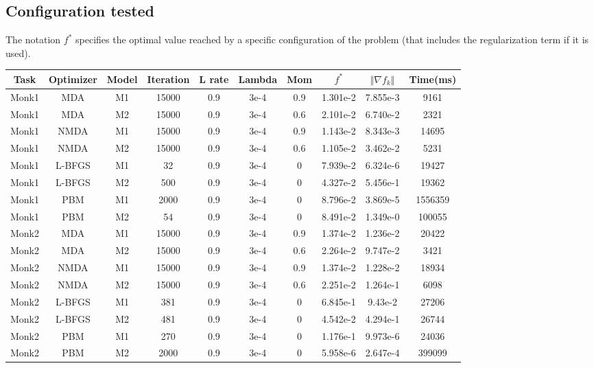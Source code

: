 \subsection{Configuration tested}
The notation $f^*$ specifies the optimal value reached by a specific configuration of the problem (that includes the regularization term if it is used). 

\begin{center}
	\small\addtolength{\tabcolsep}{-3pt}
		\centering
		\begin{longtable}{|c|c|c|c|c|c|c|c|c|c|}
			\hline
			\textbf{Task}& \textbf{Optimizer}&\textbf{Model}&\textbf{Iteration} & \textbf{L rate} & \multicolumn{1}{l|}{\textbf{Lambda}} & \textbf{Mom} & \textbf{$f^{*}$}& \textbf{$\Vert \nabla f_{k}\Vert$ }& \textbf{Time(ms)}\\ \hline 
			Monk1 & MDA & M1 & 15000 & 0.9 & 3e-4  & 0.9 & 1.301e-2  & 7.855e-3 & 9161 \\
			Monk1 & MDA & M2 & 15000 & 0.9 & 3e-4  & 0.6 & 2.101e-2 & 6.740e-2 &  2321\\
			Monk1 & NMDA & M1 & 15000 & 0.9 & 3e-4  & 0.9 & 1.143e-2 & 8.343e-3 & 14695 \\
			Monk1 & NMDA & M2 & 15000 & 0.9 & 3e-4  & 0.6 & 1.105e-2 & 3.462e-2 & 5231 \\
			Monk1 & L-BFGS & M1 & 32 & 0.9 & 3e-4  & 0 &  7.939e-2 & 6.324e-6 & 19427  \\
			Monk1 & L-BFGS & M2 & 500 & 0.9 & 3e-4  & 0 &   4.327e-2 & 5.456e-1 & 19362 \\
			Monk1 & PBM & M1 & 2000 & 0.9 & 3e-4  & 0 & 8.796e-2  & 3.869e-5 & 1556359 \\
			Monk1 & PBM & M2 & 54 & 0.9 & 3e-4  & 0 & 8.491e-2 & 1.349e-0 & 100055 \\
			
			Monk2 & MDA & M1 & 15000 & 0.9 & 3e-4  & 0.9 & 1.374e-2 & 1.236e-2 & 20422 \\
			Monk2 & MDA & M2 & 15000 & 0.9 & 3e-4  & 0.6 & 2.264e-2 & 9.747e-2 & 3421 \\
			Monk2 & NMDA & M1 & 15000 & 0.9 & 3e-4  & 0.9 &  1.374e-2 & 1.228e-2 & 18934  \\
			Monk2 & NMDA & M2 & 15000 & 0.9 & 3e-4  & 0.6 & 2.251e-2 & 1.264e-1 & 6098 \\
			Monk2 & L-BFGS & M1 & 381 & 0.9 & 3e-4  & 0 & 6.845e-1 & 9.43e-2 & 27206 \\
			Monk2 & L-BFGS & M2 & 481 & 0.9 & 3e-4  & 0 & 4.542e-2 & 4.294e-1 & 26744 \\
			Monk2 & PBM & M1 & 270 & 0.9 & 3e-4  & 0 & 1.176e-1  & 9.973e-6 & 24036 \\
			Monk2 & PBM & M2 & 2000 & 0.9 & 3e-4  & 0 & 5.958e-6 & 2.647e-4 & 399099 \\
			

\end{longtable}
\end{center}
